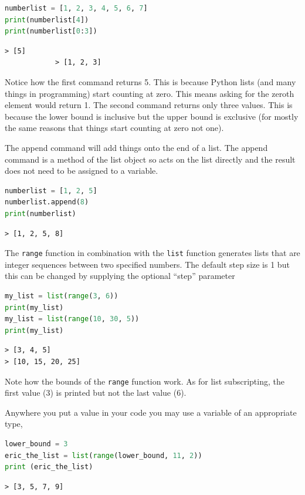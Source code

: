 		\begin{lstlisting}[language=Python]
numberlist = [1, 2, 3, 4, 5, 6, 7]
print(numberlist[4])
print(numberlist[0:3])\end{lstlisting}
		\begin{verbatim}> [5]
			> [1, 2, 3]
		\end{verbatim}
		Notice how the first command returns 5. This is because Python lists (and many things in programming) start counting at zero. This means asking for the zeroth element would return 1.
		The second command returns only three values. This is because the lower bound is inclusive but the upper bound is exclusive (for mostly the same reasons that things start counting at zero not one).

		The append command will add things onto the end of a list. The append command is a method of the list object so acts on the list directly and the result does not need to be assigned to a variable.
		\begin{lstlisting}[language=Python]
numberlist = [1, 2, 5]
numberlist.append(8)
print(numberlist)	\end{lstlisting}
		\begin{verbatim}> [1, 2, 5, 8]\end{verbatim}
		The \texttt{range} function in combination with the \texttt{list} function generates lists that are integer sequences between two specified numbers. The default step size is 1 but this can be changed by supplying the optional ``step'' parameter
\begin{lstlisting}[language=Python]
my_list = list(range(3, 6))
print(my_list)	
my_list = list(range(10, 30, 5))
print(my_list)
\end{lstlisting}
		\begin{verbatim}
> [3, 4, 5]
> [10, 15, 20, 25]\end{verbatim}
		Note how the bounds of the \texttt{range} function work. As for list subscripting, the first value (3) is printed but not the last value (6).

Anywhere you put a value in your code you may use a variable of an appropriate type,
\begin{lstlisting}[language=Python]
lower_bound = 3
eric_the_list = list(range(lower_bound, 11, 2))
print (eric_the_list)
\end{lstlisting}
		\begin{verbatim}
> [3, 5, 7, 9]\end{verbatim}
